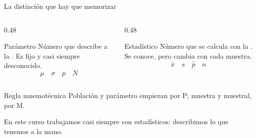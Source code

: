 \documentclass[aspectratio=169,10pt]{beamer}
\begin{document}
\begin{frame}{La distinción que hay que memorizar}
  \begin{columns}[T,onlytextwidth]
    \begin{column}{0.48\textwidth}
      \begin{block}{Parámetro}
        \footnotesize
        Número que describe a la . Es fijo y casi siempre
        desconocido.
        \vspace{0.1cm}
        \[ \mu \quad \sigma \quad p \quad N \]
      \end{block}
    \end{column}
    \begin{column}{0.48\textwidth}
      \begin{exampleblock}{Estadístico}
        \footnotesize
        Número que se calcula con la . Se conoce, pero cambia con
        cada muestra.
        \vspace{0.1cm}
        \[ \bar{x} \quad s \quad \hat{p} \quad n \]
      \end{exampleblock}
    \end{column}
  \end{columns}

  \vspace{0.3cm}
  \begin{alertblock}{Regla mnemotécnica}
    \footnotesize
     Población y parámetro empiezan por P; muestra y muestral, por M.
  \end{alertblock}

  \vspace{0.1cm}
  {\footnotesize\color{uniGris} En este curso trabajamos casi siempre con
  estadísticos: describimos lo que tenemos a la mano.}
\end{frame}

\end{document}
